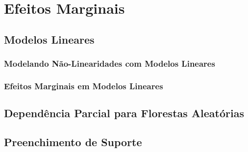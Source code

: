 
\chapter{Efeitos Marginais}
\section{Modelos Lineares}
\subsection{Modelando Não-Linearidades com Modelos Lineares}
\subsection{Efeitos Marginais em Modelos Lineares}
\section{Dependência Parcial para Florestas Aleatórias}
\section{Preenchimento de Suporte}